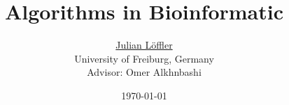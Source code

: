 \documentclass[12pt,a4paper,english,intoc,bibliography=totoc,index=totoc,BCOR10mm,captions=tableheading,fleqn,oneside]{scrartcl}
\begin{document}
\title{Algorithms in Bioinformatic}
\author{\href{mailto:loefflju@informatik.uni-freiburg.de}{Julian L\"offler}\\ {\small University of Freiburg, Germany}\\[1cm]{\small Advisor: Omer Alkhnbashi}}
\date{\small\today}

\maketitle
\thispagestyle{empty}
\clearpage
{}
\hypersetup{pageanchor=false}
\tableofcontents
\hypersetup{pageanchor=true}  %

\clearpage
{}



\pagebreak


\end{document}
